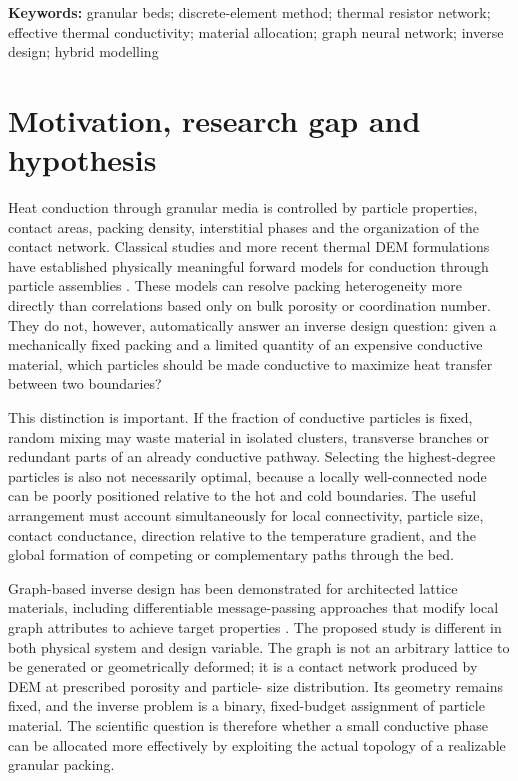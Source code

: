 \documentclass[12pt,a4paper]{article}
\begin{document}
\noindent\textbf{Keywords:} granular beds; discrete-element method; thermal
resistor network; effective thermal conductivity; material allocation; graph
neural network; inverse design; hybrid modelling

\section{Motivation, research gap and hypothesis}

Heat conduction through granular media is controlled by particle properties,
contact areas, packing density, interstitial phases and the organization of the
contact network. Classical studies and more recent thermal DEM formulations
have established physically meaningful forward models for conduction through
particle assemblies \cite{Batchelor1977,Vargas2001,Kiani2019}. These models can
resolve packing heterogeneity more directly than correlations based only on
bulk porosity or coordination number. They do not, however, automatically
answer an inverse design question: given a mechanically fixed packing and a
limited quantity of an expensive conductive material, which particles should
be made conductive to maximize heat transfer between two boundaries?

This distinction is important. If the fraction of conductive particles is
fixed, random mixing may waste material in isolated clusters, transverse
branches or redundant parts of an already conductive pathway. Selecting the
highest-degree particles is also not necessarily optimal, because a locally
well-connected node can be poorly positioned relative to the hot and cold
boundaries. The useful arrangement must account simultaneously for local
connectivity, particle size, contact conductance, direction relative to the
temperature gradient, and the global formation of competing or complementary
paths through the bed.

Graph-based inverse design has been demonstrated for architected lattice
materials, including differentiable message-passing approaches that modify
local graph attributes to achieve target properties \cite{Dold2023}. The
proposed study is different in both physical system and design variable. The
graph is not an arbitrary lattice to be generated or geometrically deformed;
it is a contact network produced by DEM at prescribed porosity and particle-
size distribution. Its geometry remains fixed, and the inverse problem is a
binary, fixed-budget assignment of particle material. The scientific question
is therefore whether a small conductive phase can be allocated more effectively
by exploiting the actual topology of a realizable granular packing.
\end{document}
